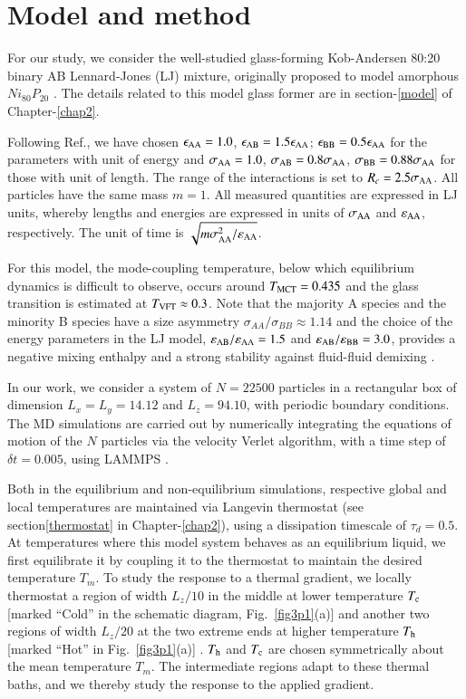 \section{Model and method}

For our study, we consider the well-studied glass-forming Kob-Andersen 80:20 binary AB Lennard-Jones (LJ) mixture,  originally proposed to model amorphous $Ni_{80}P_{20}$ \cite{Kob94}. The details related to this model glass former are in section-\ref{model} of Chapter-\ref{chap2}.  

Following Ref.\cite{Kob94}, we have chosen $\epsilon_{\rm{AA}} = 1.0$, $\epsilon_{\rm{AB}} = 1.5\epsilon_{\rm{AA}}$; $\epsilon_{\rm{BB}} = 0.5\epsilon_{\rm{AA}}$ for the parameters with unit of energy and $\sigma_{\rm{AA}} = 1.0$, $\sigma_{\rm{AB}} = 0.8\sigma_{\rm{AA}}$, $\sigma_{\rm{BB}} = 0.88\sigma_{\rm{AA}}$ for those with unit of length. The range of the interactions is set to $R_{c} = 2.5\sigma_{\rm{AA}}$. All particles have the same mass $m=1$.  All measured quantities are expressed in LJ units, whereby lengths and energies are expressed in units of $\sigma_{\rm AA}$ and $\varepsilon_{\rm AA}$, respectively.  The unit of time is $\sqrt{{m\sigma_{\rm
AA}^{2}}/\varepsilon_{\rm AA}}$.

For this model, the mode-coupling temperature, below which equilibrium dynamics is difficult to observe, occurs around $T_{\rm MCT}=0.435$ and the glass transition is estimated at $T_{\rm VFT}\approx{0.3}$.  Note that the majority A species and the minority B species have a size asymmetry $\sigma_{AA}/\sigma_{BB}\approx1.14$ and the choice of the energy parameters in the LJ model,  $\varepsilon_{\rm AB}/\varepsilon_{\rm AA}=1.5$ and  $\varepsilon_{\rm AB}/\varepsilon_{\rm BB}=3.0$, provides  a negative mixing enthalpy and a strong stability against fluid-fluid demixing \cite{toxvaerd09,pedersen18,amore11}.

In our work, we consider a system of $N=22500$ particles in a rectangular box of dimension $L_x = L_y = 14.12$ and $L_z = 94.10$, with periodic boundary conditions. The MD simulations are carried out by numerically integrating the equations of motion of the $N$ particles via the velocity Verlet algorithm, with a time step of $\delta{t}=0.005$, using LAMMPS \cite{lammps}.

Both in the equilibrium and non-equilibrium simulations, respective global and local temperatures are maintained via Langevin thermostat (see section\ref{thermostat} in Chapter-\ref{chap2}), using a dissipation timescale of $\tau_d=0.5$. At temperatures where this model system behaves as an equilibrium liquid, we first equilibrate it by coupling it to the thermostat to maintain the desired temperature $T_m$. To study the response to a thermal gradient, we locally thermostat a region of width $L_z/10$ in the middle at lower temperature $T_{\rm c}$ [marked ``Cold'' in the schematic diagram, Fig.~\ref{fig3p1}(a)] and another two regions of width $L_z/20$ at the two extreme ends at higher temperature $T_{\rm h}$ [marked ``Hot'' in Fig.~\ref{fig3p1}(a)] \cite{ikeshoji1994}. $T_{\rm h}$ and $T_{\rm c}$ are chosen symmetrically about the mean temperature $T_m$. The intermediate regions adapt to these thermal baths, and we thereby study the response to the applied gradient.

